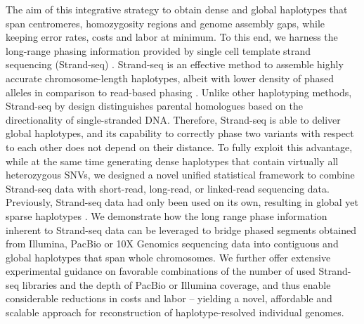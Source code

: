 The aim of this integrative strategy to obtain dense and global haplotypes that span centromeres, homozygosity regions and genome assembly gaps, while keeping error rates, costs and labor at minimum. 
To this end, we harness the long-range phasing information provided by single cell template strand sequencing (Strand-seq) \citep{falconer2012dna, sanders2017single}. Strand-seq is an effective method to assemble highly 
accurate chromosome-length haplotypes, albeit with lower density of phased alleles in comparison to read-based phasing \citep{porubsky2016direct}. 
Unlike other haplotyping methods, Strand-seq by design distinguishes parental homologues based on the directionality of single-stranded DNA. 
Therefore, Strand-seq is able to deliver global haplotypes, and its capability to correctly phase two variants with respect to each other does not depend on their distance. 
To fully exploit this advantage, while at the same time generating dense haplotypes that contain virtually all heterozygous SNVs, we designed a novel unified statistical framework to combine 
Strand-seq data with short-read, long-read, or linked-read sequencing data. 
Previously, Strand-seq data had only been used on its own, resulting in global yet sparse haplotypes \citep{porubsky2016direct}. 
We demonstrate how the long range phase information inherent to Strand-seq data can be leveraged to bridge phased segments obtained from Illumina, PacBio or 10X Genomics sequencing data into contiguous and global haplotypes that span whole chromosomes.
We further offer extensive experimental guidance on favorable combinations of the number of used Strand-seq libraries and the depth of PacBio or Illumina coverage, 
and thus enable considerable reductions in costs and labor – yielding a novel, affordable and scalable approach for reconstruction of haplotype-resolved individual genomes.
